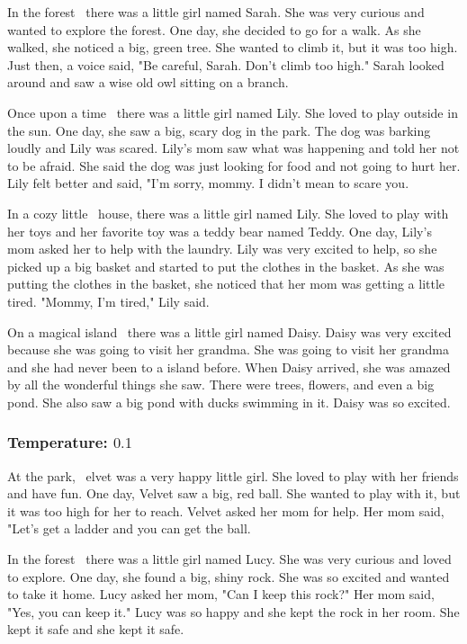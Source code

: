 \documentclass[11pt]{article}
\begin{document}
    In the forest \textellipsis\ there was a little girl named Sarah. She was very curious and wanted to explore the forest. One day, she decided to go for a walk. As she walked, she noticed a big, green tree. She wanted to climb it, but it was too high. Just then, a voice said, "Be careful, Sarah. Don't climb too high." Sarah looked around and saw a wise old owl sitting on a branch.

    Once upon a time \textellipsis\ there was a little girl named Lily. She loved to play outside in the sun. One day, she saw a big, scary dog in the park. The dog was barking loudly and Lily was scared.  Lily's mom saw what was happening and told her not to be afraid. She said the dog was just looking for food and not going to hurt her. Lily felt better and said, "I'm sorry, mommy. I didn't mean to scare you.

    In a cozy little \textellipsis\ house, there was a little girl named Lily. She loved to play with her toys and her favorite toy was a teddy bear named Teddy. One day, Lily's mom asked her to help with the laundry. Lily was very excited to help, so she picked up a big basket and started to put the clothes in the basket. As she was putting the clothes in the basket, she noticed that her mom was getting a little tired. "Mommy, I'm tired," Lily said.

    On a magical island \textellipsis\ there was a little girl named Daisy. Daisy was very excited because she was going to visit her grandma. She was going to visit her grandma and she had never been to a island before. When Daisy arrived, she was amazed by all the wonderful things she saw. There were trees, flowers, and even a big pond. She also saw a big pond with ducks swimming in it. Daisy was so excited.

    \subsubsection*{Temperature: $0.1$}

    At the park, \textellipsis\ elvet was a very happy little girl. She loved to play with her friends and have fun. One day, Velvet saw a big, red ball. She wanted to play with it, but it was too high for her to reach. Velvet asked her mom for help. Her mom said, "Let's get a ladder and you can get the ball.

    In the forest \textellipsis\ there was a little girl named Lucy. She was very curious and loved to explore. One day, she found a big, shiny rock. She was so excited and wanted to take it home. Lucy asked her mom, "Can I keep this rock?" Her mom said, "Yes, you can keep it." Lucy was so happy and she kept the rock in her room. She kept it safe and she kept it safe.
\end{document}
